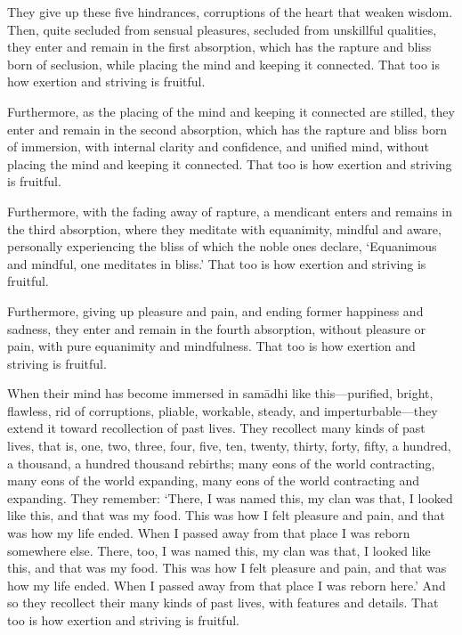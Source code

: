 \documentclass[12pt,openany]{book}%
\begin{document}
They give up these five hindrances, corruptions of the heart that weaken wisdom. Then, quite secluded from sensual pleasures, secluded from unskillful qualities, they enter and remain in the first absorption, which has the rapture and bliss born of seclusion, while placing the mind and keeping it connected. That too is how exertion and striving is fruitful. 

Furthermore, as the placing of the mind and keeping it connected are stilled, they enter and remain in the second absorption, which has the rapture and bliss born of immersion, with internal clarity and confidence, and unified mind, without placing the mind and keeping it connected. That too is how exertion and striving is fruitful. 

Furthermore, with the fading away of rapture, a mendicant enters and remains in the third absorption, where they meditate with equanimity, mindful and aware, personally experiencing the bliss of which the noble ones declare, ‘Equanimous and mindful, one meditates in bliss.’ That too is how exertion and striving is fruitful. 

Furthermore, giving up pleasure and pain, and ending former happiness and sadness, they enter and remain in the fourth absorption, without pleasure or pain, with pure equanimity and mindfulness. That too is how exertion and striving is fruitful. 

When their mind has become immersed in \textsanskrit{samādhi} like this—purified, bright, flawless, rid of corruptions, pliable, workable, steady, and imperturbable—they extend it toward recollection of past lives. They recollect many kinds of past lives, that is, one, two, three, four, five, ten, twenty, thirty, forty, fifty, a hundred, a thousand, a hundred thousand rebirths; many eons of the world contracting, many eons of the world expanding, many eons of the world contracting and expanding. They remember: ‘There, I was named this, my clan was that, I looked like this, and that was my food. This was how I felt pleasure and pain, and that was how my life ended. When I passed away from that place I was reborn somewhere else. There, too, I was named this, my clan was that, I looked like this, and that was my food. This was how I felt pleasure and pain, and that was how my life ended. When I passed away from that place I was reborn here.’ And so they recollect their many kinds of past lives, with features and details. That too is how exertion and striving is fruitful. 
\end{document}
